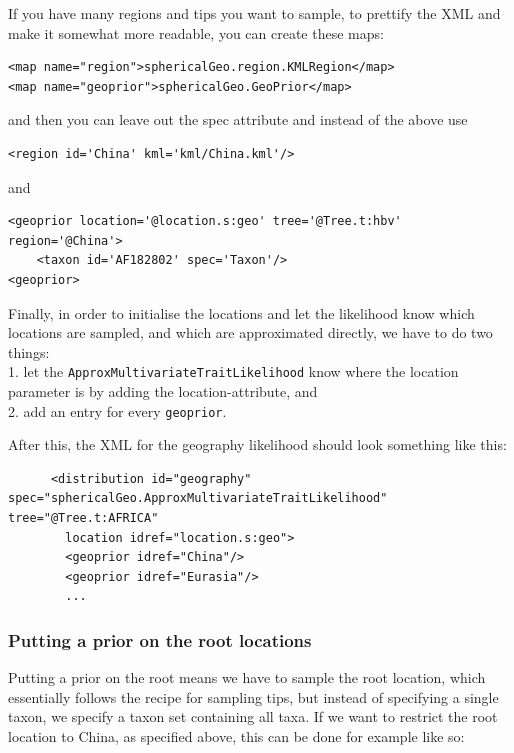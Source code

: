 \documentclass{article}
\begin{document}
If you have many regions and tips you want to sample, to prettify the XML and make it somewhat more readable, you can create these maps:

\begin{verbatim}
<map name="region">sphericalGeo.region.KMLRegion</map>
<map name="geoprior">sphericalGeo.GeoPrior</map>
\end{verbatim}

and then you can leave out the spec attribute and instead of the above use

\begin{verbatim}
<region id='China' kml='kml/China.kml'/>
\end{verbatim}

and 

\begin{verbatim}
<geoprior location='@location.s:geo' tree='@Tree.t:hbv' region='@China'>
	<taxon id='AF182802' spec='Taxon'/>
<geoprior>
\end{verbatim}



Finally, in order to initialise the locations and let the likelihood know which locations are sampled, and which are approximated directly, we have to do two things:\\
1. let the {\tt ApproxMultivariateTraitLikelihood} know where the location parameter is by adding the location-attribute, and\\
2. add an entry for every {\tt geoprior}.

After this, the XML for the geography likelihood should look something like this:

\begin{verbatim}
      <distribution id="geography" spec="sphericalGeo.ApproxMultivariateTraitLikelihood" tree="@Tree.t:AFRICA" 
		location idref="location.s:geo">
        <geoprior idref="China"/>
        <geoprior idref="Eurasia"/>
        ...
\end{verbatim}


\subsubsection*{Putting a prior on the root locations}

Putting a prior on the root means we have to sample the root location, which essentially follows the recipe for sampling tips, but instead of specifying a single taxon, we specify a taxon set containing all taxa. If we want to restrict the root location to China, as specified above, this can be done for example like so:
\end{document}
